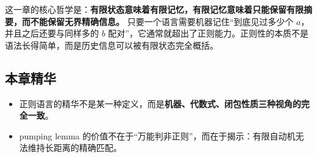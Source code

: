 这一章的核心哲学是：\textbf{有限状态意味着有限记忆，有限记忆意味着只能保留有限摘要，而不能保留无界精确信息。}
只要一个语言需要机器记住“到底见过多少个 $a$，并且之后还要与同样多的 $b$ 配对”，它通常就超出了正则能力。正则性的本质不是语法长得简单，而是历史信息可以被有限状态完全概括。

\subsection{本章精华}

\begin{itemize}[leftmargin=2em]
  \item 正则语言的精华不是某一种定义，而是\textbf{机器、代数式、闭包性质三种视角的完全一致}。
  \item pumping lemma 的价值不在于“万能判非正则”，而在于揭示：有限自动机无法维持长距离的精确匹配。
\end{itemize}

\newpage
